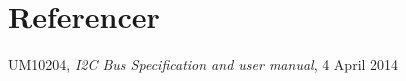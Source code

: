 \chapter{Referencer}

\begin{thebibliography}{9}
	
	UM10204,
	\textit{I2C Bus Specification and user manual}, 4 April 2014
	
\end{thebibliography}